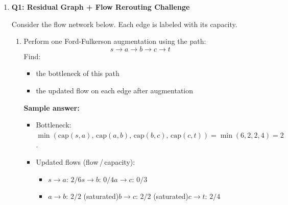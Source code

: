 \documentclass[11pt]{article}
\begin{document}
\begin{enumerate}[leftmargin=0pt, itemindent=1.7em, itemsep=1.2em]

\item \textbf{Q1: Residual Graph + Flow Rerouting Challenge}

\noindent
Consider the flow network below. Each edge is labeled with its capacity.

\begin{center}
\end{center}

\begin{enumerate}[label=\arabic*., leftmargin=1.5em, itemsep=1.0em]

  \item Perform one Ford-Fulkerson augmentation using the path:
  \[
    s \to a \to b \to c \to t
  \]
  Find:
  \begin{itemize}
    \item the bottleneck of this path
    \item the updated flow on each edge after augmentation
  \end{itemize}

  \vspace{4.5cm}

  \ifanswers
  \textbf{Sample answer:}
  \begin{itemize}
    \item Bottleneck: $\min(\mathrm{cap}(s,a),\,\mathrm{cap}(a,b),\,\mathrm{cap}(b,c),\,\mathrm{cap}(c,t)) = \min(6,2,2,4) = 2$.
    \item Updated flows (flow\,/\,capacity):
    \begin{itemize}
      \item $s \to a$: $2/6$\quad $s \to b$: $0/4$\quad $a \to c$: $0/3$
      \item $a \to b$: $2/2$ (saturated)\quad $b \to c$: $2/2$ (saturated)\quad $c \to t$: $2/4$
    \end{itemize}
  \end{itemize}
  \fi


\end{enumerate}
\end{enumerate}
\end{document}
